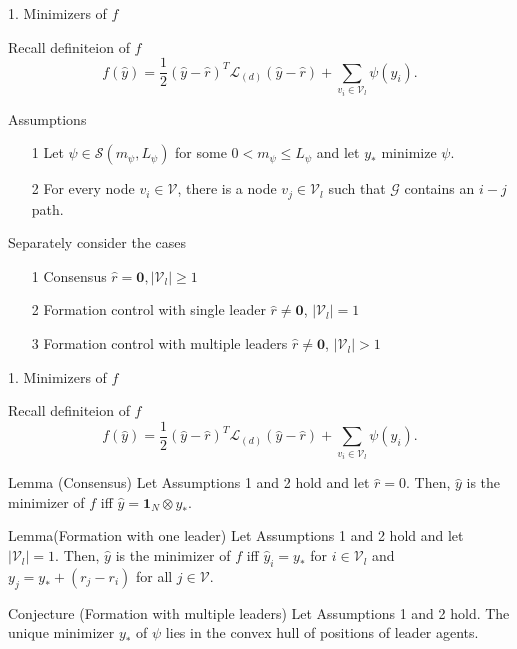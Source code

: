 \documentclass{beamer}
\begin{document}
\begin{frame}{1. Minimizers of $f$}
	\begin{block}{Recall definiteion of $f$}
		$$f(\hat{y})=\frac{1}{2}(\hat{y}-\hat{r})^T\mathcal{L}_{(d)}(\hat{y}-\hat{r}) + \sum_{v_i \in \mathcal{V}_l} \psi(y_i).$$		
	\end{block}
	\pause
	\begin{block}{Assumptions}
	\begin{itemize}
		\item[1] Let $\psi \in \mathcal{S}(m_{\psi},L_{\psi})$ for some $0<m_{\psi}\leq L_{\psi}$ and let $y_*$ minimize $\psi$.
		\item[2] For every node $v_i \in \mathcal{V}$, there is a node $v_j \in \mathcal{V}_l$ such that $\mathcal{G}$ contains an $i-j$ path.
	\end{itemize}
	\end{block}
\pause 
\begin{block}{Separately consider the cases}
\begin{itemize} 
	\item[1] Consensus $\hat{r}=\mathbf{0},|\mathcal{V}_l|\geq 1$
	\item[2] Formation control with single leader $\hat{r}\neq \mathbf{0}$, $|\mathcal{V}_l|=1$
	\item[3] Formation control with multiple leaders $\hat{r}\neq \mathbf{0}$, $|\mathcal{V}_l|>1$
\end{itemize}
\end{block}
\end{frame}
\begin{frame}{1. Minimizers of $f$}
	\begin{block}{Recall definiteion of $f$}
		$$f(\hat{y})=\frac{1}{2}(\hat{y}-\hat{r})^T\mathcal{L}_{(d)}(\hat{y}-\hat{r}) + \sum_{v_i \in \mathcal{V}_l} \psi(y_i).$$		
	\end{block}
	\begin{block}{Lemma (Consensus)}
	Let Assumptions 1 and 2 hold and let $\hat{r}=0$.
	Then, $\hat{y}$ is the minimizer of $f$ iff $\hat{y}=\mathbf{1}_N \otimes y_*$.
	\end{block}
\pause 
\begin{block}{Lemma(Formation with one leader)}
	Let Assumptions 1 and 2 hold and let $|\mathcal{V}_l|=1$.
	Then, $\hat{y}$ is the minimizer of $f$ iff $\hat{y}_i=y_*$ for $i \in \mathcal{V}_l$ and $y_j=y_*+(r_j-r_i)$ for all $j \in \mathcal{V}$.
\end{block}
\pause 
\begin{block}{Conjecture (Formation with multiple leaders)}
	Let Assumptions 1 and 2 hold. 
	The unique minimizer $y_*$ of $\psi$ lies in the convex hull of positions of leader agents. 
\end{block}
\end{frame}
\end{document}
